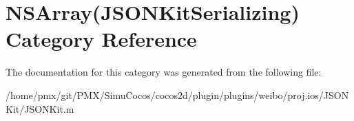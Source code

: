 \hypertarget{categoryNSArray_07JSONKitSerializing_08}{}\section{N\+S\+Array(J\+S\+O\+N\+Kit\+Serializing) Category Reference}
\label{categoryNSArray_07JSONKitSerializing_08}


The documentation for this category was generated from the following file\+:\begin{DoxyCompactItemize}
\item 
/home/pmx/git/\+P\+M\+X/\+Simu\+Cocos/cocos2d/plugin/plugins/weibo/proj.\+ios/\+J\+S\+O\+N\+Kit/J\+S\+O\+N\+Kit.\+m\end{DoxyCompactItemize}
